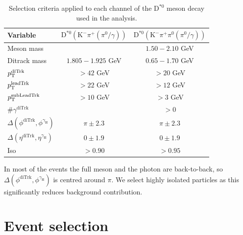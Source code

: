 \begin{table}[!ht]
    \centering
    \begin{tabular}{|l|c|c|}
        \hline
        \cellcolor{lightgray}Variable & \cellcolor{lightgray}$\text{D}^{*0}(\text{K}^{-}\pi^{+}{\scriptstyle(\pi^{0}/\gamma)})$ & \cellcolor{lightgray}$\text{D}^{*0}(\text{K}^{-}\pi^{+}\pi^{0}{\scriptstyle(\pi^{0}/\gamma)})$ \\ \hline
        Meson mass                                              &                   &$1.50-2.10$ GeV  \\
        Ditrack mass                                            &$1.805-1.925$ GeV  &$0.65-1.70$ GeV  \\
        $p_\text{T}^{\text{diTrk}}$                                    &$>42$ GeV          &$>20$ GeV           \\
        $p_\text{T}^{\text{leadTrk}}$                                  &$>22$ GeV          &$>12$ GeV           \\
        $p_\text{T}^{\text{subLeadTrk}}$                               &$>10$ GeV          &$>3$ GeV           \\
        $\#\gamma^{\text{diTrk}}$                               &                   &$>0$               \\
        $\Delta(\phi^{\text{diTrk}}, \phi^{\gamma_\text{H}})$   &$\pi\pm2.3$        &$\pi\pm2.3$        \\
        $\Delta(\eta^{\text{diTrk}}, \eta^{\gamma_\text{H}})$   &$0\pm1.9$          &$0\pm1.9$           \\
        Iso                                                     &$>0.90$            &$>0.95$             \\
        \hline
        \end{tabular}
    \caption{Selection criteria applied to each channel of the $\text{D}^{*0}$ meson decay used in the analysis.}
    \label{tab:meson_selection_2}
\end{table}

In most of the events the full meson and the photon are back-to-back, so $\Delta(\phi^{\text{diTrk}}, \phi^{\gamma_\text{H}})$ is centred around $\pi$. We select highly isolated particles as this significantly reduces background contribution.

\section{Event selection}\label{sec:event_selection}

